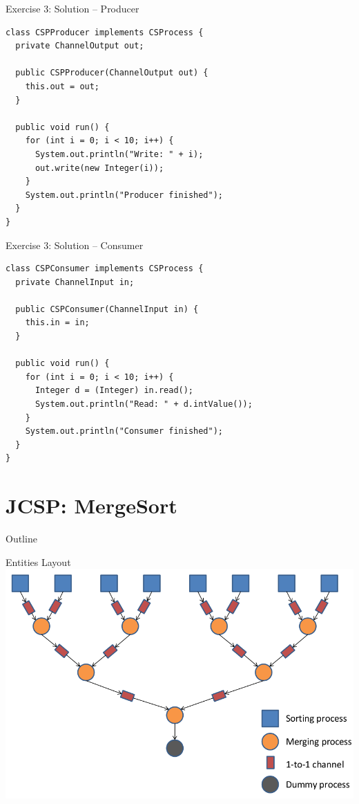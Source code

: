 \begin{frame}[fragile]{Exercise 3: Solution -- Producer}
\begin{lstlisting}
class CSPProducer implements CSProcess {
  private ChannelOutput out;

  public CSPProducer(ChannelOutput out) {
    this.out = out;
  }

  public void run() {
    for (int i = 0; i < 10; i++) {
      System.out.println("Write: " + i);
      out.write(new Integer(i));
    }
    System.out.println("Producer finished");
  }
}
\end{lstlisting}
\end{frame}

\begin{frame}[fragile]{Exercise 3: Solution -- Consumer}
\begin{lstlisting}
class CSPConsumer implements CSProcess {
  private ChannelInput in;

  public CSPConsumer(ChannelInput in) {
    this.in = in;
  }

  public void run() {
    for (int i = 0; i < 10; i++) {
      Integer d = (Integer) in.read();
      System.out.println("Read: " + d.intValue());
    }
    System.out.println("Consumer finished");
  }
}
\end{lstlisting}
\end{frame}


\section{JCSP: MergeSort}

\begin{frame}{Outline}
  \tableofcontents[current]
\end{frame}

\begin{frame}{Entities Layout}
  \includegraphics[width=\textwidth]{figures/mergesort}
\end{frame}

